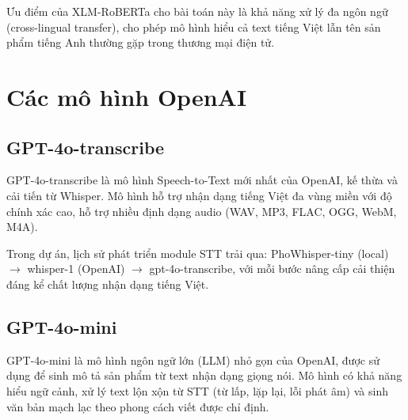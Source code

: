 Ưu điểm của XLM-RoBERTa cho bài toán này là khả năng xử lý đa ngôn ngữ
(cross-lingual transfer), cho phép mô hình hiểu cả text tiếng Việt lẫn
tên sản phẩm tiếng Anh thường gặp trong thương mại điện tử.

\section{Các mô hình OpenAI}

\subsection{GPT-4o-transcribe}

GPT-4o-transcribe là mô hình Speech-to-Text mới nhất của OpenAI,
kế thừa và cải tiến từ Whisper. Mô hình hỗ trợ nhận dạng tiếng Việt
đa vùng miền với độ chính xác cao, hỗ trợ nhiều định dạng audio
(WAV, MP3, FLAC, OGG, WebM, M4A).

Trong dự án, lịch sử phát triển module STT trải qua:
PhoWhisper-tiny (local) $\rightarrow$ whisper-1 (OpenAI) $\rightarrow$ gpt-4o-transcribe,
với mỗi bước nâng cấp cải thiện đáng kể chất lượng nhận dạng tiếng Việt.

\subsection{GPT-4o-mini}

GPT-4o-mini là mô hình ngôn ngữ lớn (LLM) nhỏ gọn của OpenAI,
được sử dụng để sinh mô tả sản phẩm từ text nhận dạng giọng nói.
Mô hình có khả năng hiểu ngữ cảnh, xử lý text lộn xộn từ STT
(từ lấp, lặp lại, lỗi phát âm) và sinh văn bản mạch lạc theo
phong cách viết được chỉ định.
